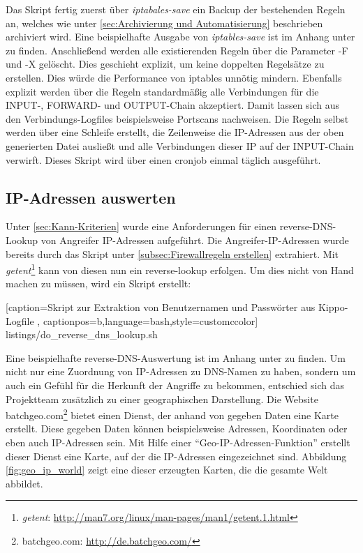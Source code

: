 Das Skript fertig zuerst über \textit{iptabales-save} ein Backup der bestehenden Regeln an, welches wie unter \ref{sec:Archivierung und Automatisierung} beschrieben archiviert wird. Eine beispielhafte Ausgabe von \textit{iptables-save} ist im Anhang unter \textit{} zu finden. Anschließend werden alle existierenden Regeln über die Parameter -F und -X gelöscht. Dies geschieht explizit, um keine doppelten Regelsätze zu erstellen. Dies würde die Performance von iptables unnötig mindern. Ebenfalls explizit werden über die Regeln standardmäßig alle Verbindungen für die INPUT-, FORWARD- und OUTPUT-Chain akzeptiert. Damit lassen sich aus den Verbindungs-Logfiles beispielsweise Portscans nachweisen. Die Regeln selbst werden über eine Schleife erstellt, die Zeilenweise die IP-Adressen aus der oben generierten Datei ausließt und alle Verbindungen dieser IP auf der INPUT-Chain verwirft. Dieses Skript wird über einen cronjob einmal täglich ausgeführt.



\subsection{IP-Adressen auswerten}
\label{subsec:IP-Adressen auswerten}

Unter \ref{sec:Kann-Kriterien} wurde eine Anforderungen für einen reverse-DNS-Lookup von Angreifer IP-Adressen aufgeführt. Die Angreifer-IP-Adressen wurde bereits durch das Skript unter \ref{subsec:Firewallregeln erstellen} extrahiert. Mit \textit{getent}\footnote{ \textit{getent}: \url{http://man7.org/linux/man-pages/man1/getent.1.html}} kann von diesen nun ein reverse-lookup erfolgen. Um dies nicht von Hand machen zu müssen, wird ein Skript erstellt:


    [caption={Skript zur Extraktion von Benutzernamen und Passwörter aus Kippo-Logfile}
       \label{lst:reverse_dns},
       captionpos=b,language=bash,style=customccolor]
 {listings/do_reverse_dns_lookup.sh}

Eine beispielhafte reverse-DNS-Auswertung ist im Anhang unter \textit{} zu finden.
Um nicht nur eine Zuordnung von IP-Adressen zu DNS-Namen zu haben, sondern um auch ein Gefühl für die Herkunft der Angriffe zu bekommen, entschied sich das Projektteam zusätzlich zu einer geographischen Darstellung. Die Website batchgeo.com\footnote{ batchgeo.com: \url{http://de.batchgeo.com/}} bietet einen Dienst, der anhand von gegeben Daten eine Karte erstellt. Diese gegeben Daten können beispielsweise Adressen, Koordinaten oder eben auch IP-Adressen sein. Mit Hilfe einer "`Geo-IP-Adressen-Funktion"' erstellt dieser Dienst eine Karte, auf der die IP-Adressen eingezeichnet sind. Abbildung \ref{fig:geo_ip_world} zeigt eine dieser erzeugten Karten, die die gesamte Welt abbildet.

